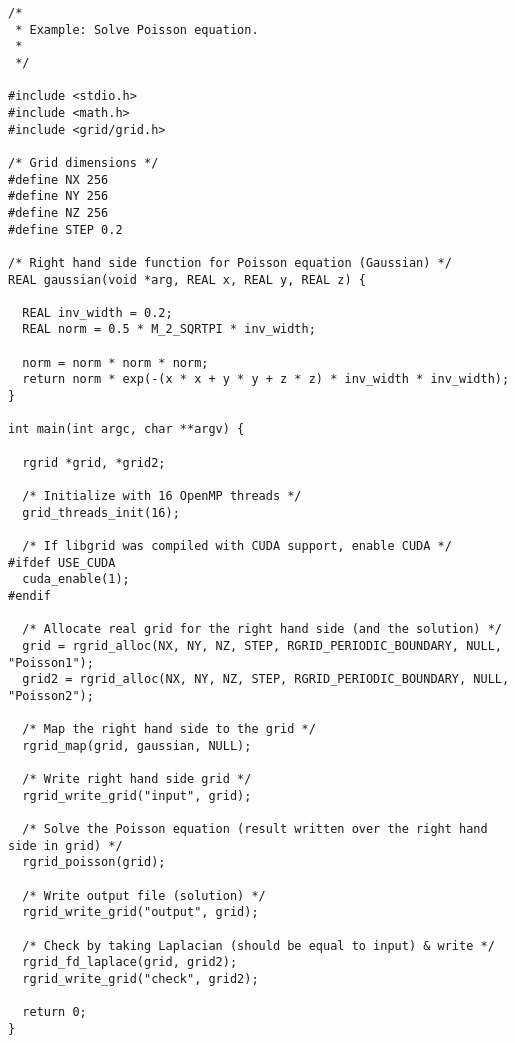 \documentclass[12pt,letterpaper]{report}
\begin{document}
\begin{verbatim}
/*
 * Example: Solve Poisson equation.
 *
 */

#include <stdio.h>
#include <math.h>
#include <grid/grid.h>

/* Grid dimensions */
#define NX 256
#define NY 256
#define NZ 256
#define STEP 0.2

/* Right hand side function for Poisson equation (Gaussian) */
REAL gaussian(void *arg, REAL x, REAL y, REAL z) {

  REAL inv_width = 0.2;
  REAL norm = 0.5 * M_2_SQRTPI * inv_width;

  norm = norm * norm * norm;
  return norm * exp(-(x * x + y * y + z * z) * inv_width * inv_width);
}

int main(int argc, char **argv) {
  
  rgrid *grid, *grid2;
  
  /* Initialize with 16 OpenMP threads */
  grid_threads_init(16);

  /* If libgrid was compiled with CUDA support, enable CUDA */
#ifdef USE_CUDA
  cuda_enable(1);
#endif
  
  /* Allocate real grid for the right hand side (and the solution) */
  grid = rgrid_alloc(NX, NY, NZ, STEP, RGRID_PERIODIC_BOUNDARY, NULL, "Poisson1");
  grid2 = rgrid_alloc(NX, NY, NZ, STEP, RGRID_PERIODIC_BOUNDARY, NULL, "Poisson2");

  /* Map the right hand side to the grid */
  rgrid_map(grid, gaussian, NULL);

  /* Write right hand side grid */
  rgrid_write_grid("input", grid);

  /* Solve the Poisson equation (result written over the right hand side in grid) */
  rgrid_poisson(grid);  

  /* Write output file (solution) */
  rgrid_write_grid("output", grid);

  /* Check by taking Laplacian (should be equal to input) & write */
  rgrid_fd_laplace(grid, grid2);
  rgrid_write_grid("check", grid2);

  return 0;
}
\end{verbatim}

\end{document}
